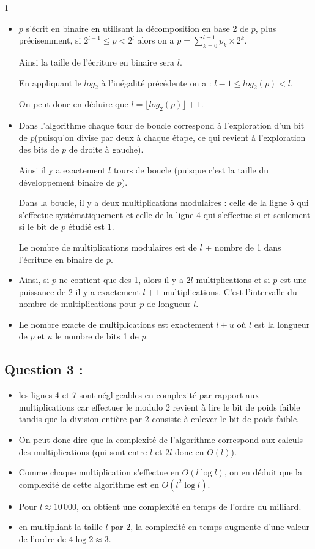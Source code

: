 1\documentclass[a4paper, 11pt,french]{article}
\begin{document}
\begin{itemize}
\item $p$ s'écrit en binaire en utilisant la décomposition en base 2 de $p$, plus précisemment, si $2^{l-1}\leqslant p< 2^l$ alors on a  $p=\sum_{k=0}^{l-1} p_k\times 2^k$.

  Ainsi la taille de l'écriture en binaire sera $l$.

  En appliquant le $log_2$ à l'inégalité précédente on a : $l-1\leqslant log_2(p) <l$.

  On peut donc en déduire que $l=\lfloor log_2(p)\rfloor +1$.


\item Dans l'algorithme chaque tour de boucle correspond à l'exploration d'un bit de $p$(puisqu'on divise par deux à chaque étape, ce qui revient à l'exploration  des bits de $p$ de droite à gauche).

  Ainsi il y a exactement $l$ tours de boucle (puisque c'est la taille du développement binaire de $p$).

  Dans la boucle, il y a deux multiplications modulaires : celle de la ligne 5 qui s'effectue systématiquement et celle de la ligne 4 qui s'effectue si et seulement si le bit de $p$ étudié est 1.

  Le nombre de multiplications modulaires est de $l$ + nombre de 1 dans l'écriture en binaire de $p$.
\item Ainsi, si $p$ ne contient que des 1, alors il y a $2l$ multiplications et si $p$ est une puissance de $2$ il y a exactement $l+1$ multiplications. C'est l'intervalle du nombre de multiplications pour $p$ de longueur $l$.
  \item Le nombre exacte de multiplications est exactement $l+u$ où $l$ est la longueur de $p$ et $u$ le nombre de bits 1 de $p$.
\end{itemize}

\subsection*{Question 3 :}

\begin{itemize}
\item les lignes 4 et 7 sont négligeables en complexité par rapport aux multiplications car effectuer le modulo 2 revient à lire le bit de poids faible tandis que la division entière par 2 consiste à enlever le bit de poids faible.
\item On peut donc dire que la complexité de l'algorithme correspond aux calculs des multiplications (qui sont entre $l$ et $2l$ donc en $O(l)$).
\item Comme chaque multiplication s'effectue en $O(l\log l)$, on en déduit que la complexité de cette algorithme est en $O(l^2\log l)$.
\item Pour $l\approx 10\,000$, on obtient une complexité en temps de l'ordre du milliard.
  \item en multipliant la taille $l$ par 2, la complexité en temps augmente d'une valeur de l'ordre de $4 \log 2 \approx 3$.
\end{itemize}
\end{document}
